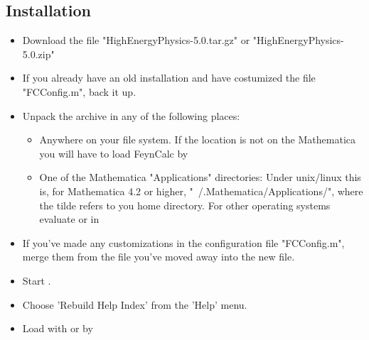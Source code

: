 \subsection{Installation}

\begin{itemize}

\item{Download the file "HighEnergyPhysics-5.0.tar.gz" or "HighEnergyPhysics-5.0.zip"}

\item{If you already have an old installation and have costumized the file "FCConfig.m", back it up.}

\item{Unpack the archive in any of the following places:

\begin{itemize}

\item{Anywhere on your file system. If the location is not on the Mathematica  you will have to load
FeynCalc by } 

\item One of the Mathematica "Applications" directories: Under {\sc unix}/{\sc linux} this is, for Mathematica 4.2 or higher,
"~/.Mathematica/Applications/", where the tilde refers to you home directory.
For other operating systems evaluate  or  in \mma
\end{itemize}
}

\item{If you've made any customizations in the configuration file "FCConfig.m", merge them from the file you've moved away into the new file.}

\item{Start \mma.}

\item{Choose 'Rebuild Help Index' from the 'Help' menu.}

\item Load \fc with  or by 

\end{itemize}



